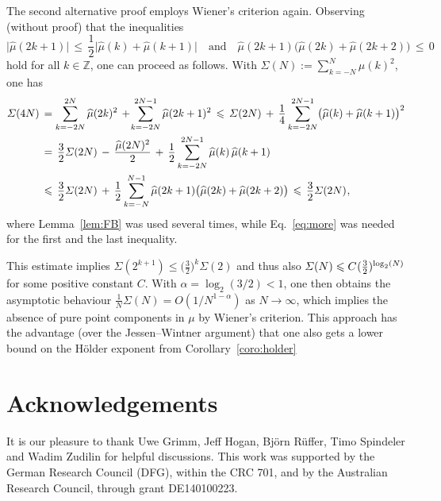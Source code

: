 \documentclass[11pt,a4paper]{amsart}
\theoremstyle{plain}
\theoremstyle{definition}
\numberwithin{equation}{section}
\newcommand{\ts}{\hspace{0.5pt}}
\newcommand{\ZZ}{\mathbb{Z}}
\newcommand{\myfrac}[2]{\frac{\raisebox{-2pt}{$#1$}}
      {\raisebox{0.5pt}{$#2$}}}
\begin{document}
The second alternative proof employs Wiener's criterion
again. Observing (without proof) that the inequalities
\begin{equation}\label{eq:more}
  \lvert \widehat{\mu} (2k+1)\rvert \, \leqslant \, 
  \frac{1}{2} \lvert \widehat{\mu} (k) + \widehat{\mu} 
  (k+1)\rvert 
  \quad \text{and} \quad
  \widehat{\mu} (2k+1) \bigl( \widehat{\mu} (2k) 
  + \widehat{\mu} (2k+2)\bigr) \, \leqslant \, 0
\end{equation}
hold for all $k\in\ZZ$, one can proceed as follows. 
With $\varSigma(N) := \sum_{k=-N}^{N} \widehat{\mu} (k)^2$, 
one has
\[
\begin{split}
  \varSigma(4N) \, & = \sum_{k=-2N}^{2N} \widehat{\mu} (2k)^2
   \, + \! \sum_{k=-2N}^{2N-1} \widehat{\mu} (2k+1)^2 
      \, \leqslant \, \varSigma(2N) \, + \,
    \myfrac{1}{4} \sum_{k=-2N}^{2N-1} \bigl( 
    \widehat{\mu} (k) + \widehat{\mu} (k+1)\bigr)^2 \\
  & = \, \myfrac{3}{2} \varSigma(2N)  \, - \, 
    \myfrac{\widehat{\mu} (2N)^2}{2}
    \, + \, \myfrac{1}{2} \sum_{k=-2N}^{2N-1} \widehat{\mu} (k)
     \, \widehat{\mu} (k+1) \\
  & \leqslant \,  \myfrac{3}{2} \varSigma(2N) \, + \,
    \myfrac{1}{2} \sum_{k=-N}^{N-1} \widehat{\mu} (2k+1) 
    \bigl( \widehat{\mu} (2k) + \widehat{\mu} (2k+2)\bigr)
   \, \leqslant \, \myfrac{3}{2} \varSigma(2N) \ts ,
\end{split}
\]
where Lemma~\ref{lem:FB} was used several times,
while Eq.~\eqref{eq:more} was needed for the first
and the last inequality.


This estimate implies
$\varSigma(2^{k+1})\leqslant \bigl(\frac{3}{2}\bigr)^{k}\varSigma(2)$
and thus also
$\varSigma(N) \leqslant C \ts ( \frac{3}{2} )_{}^{\log_{2} (N)}$ for
some positive constant $C$. With $\alpha = \log_{2} (3/2) <1$, one
then obtains the asymptotic behaviour
$\frac{1}{N} \varSigma(N) = O(1/N^{1-\alpha})$ as $N\to\infty$, which
implies the absence of pure point components in $\mu$ by Wiener's
criterion. This approach has the advantage (over the Jessen--Wintner
argument) that one also gets a lower bound on the H\"{o}lder exponent
from Corollary~\ref{coro:holder}
















\section*{Acknowledgements}
It is our pleasure to thank Uwe Grimm, Jeff Hogan, Bj\"{o}rn
R\"{u}ffer, Timo Spindeler and Wadim Zudilin for helpful discussions.
This work was supported by the German Research Council (DFG), within
the CRC 701, and by the Australian Research Council, through grant
DE{\ts}140100223.
\end{document}
